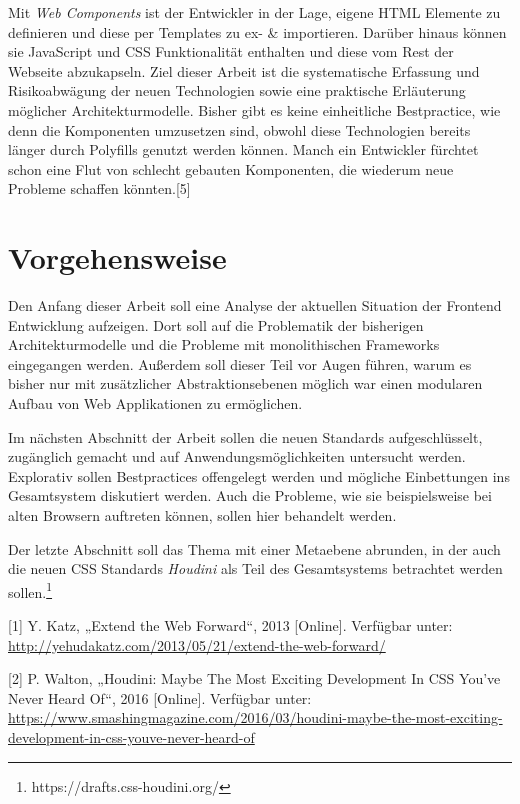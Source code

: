 Mit \emph{Web Components} ist der Entwickler in der Lage, eigene HTML
Elemente zu definieren und diese per Templates zu ex- \& importieren.
Darüber hinaus können sie JavaScript und CSS Funktionalität enthalten
und diese vom Rest der Webseite abzukapseln. Ziel dieser Arbeit ist die
systematische Erfassung und Risikoabwägung der neuen Technologien sowie
eine praktische Erläuterung möglicher Architekturmodelle. Bisher gibt es
keine einheitliche Bestpractice, wie denn die Komponenten umzusetzen
sind, obwohl diese Technologien bereits länger durch Polyfills genutzt
werden können. Manch ein Entwickler fürchtet schon eine Flut von
schlecht gebauten Komponenten, die wiederum neue Probleme schaffen
könnten.{[}5{]}

\section{Vorgehensweise}\label{vorgehensweise}

Den Anfang dieser Arbeit soll eine Analyse der aktuellen Situation der
Frontend Entwicklung aufzeigen. Dort soll auf die Problematik der
bisherigen Architekturmodelle und die Probleme mit monolithischen
Frameworks eingegangen werden. Außerdem soll dieser Teil vor Augen
führen, warum es bisher nur mit zusätzlicher Abstraktionsebenen möglich
war einen modularen Aufbau von Web Applikationen zu ermöglichen.

Im nächsten Abschnitt der Arbeit sollen die neuen Standards
aufgeschlüsselt, zugänglich gemacht und auf Anwendungsmöglichkeiten
untersucht werden. Explorativ sollen Bestpractices offengelegt werden
und mögliche Einbettungen ins Gesamtsystem diskutiert werden. Auch die
Probleme, wie sie beispielsweise bei alten Browsern auftreten können,
sollen hier behandelt werden.

Der letzte Abschnitt soll das Thema mit einer Metaebene abrunden, in der
auch die neuen CSS Standards \emph{Houdini} als Teil des Gesamtsystems
betrachtet werden sollen.\footnote{https://drafts.css-houdini.org/}

\hypertarget{refs}{}
\hypertarget{ref-Katz2013}{}
{[}1{]} Y. Katz, „Extend the Web Forward``, 2013 {[}Online{]}. Verfügbar
unter: \url{http://yehudakatz.com/2013/05/21/extend-the-web-forward/}

\hypertarget{ref-Walton2016}{}
{[}2{]} P. Walton, „Houdini: Maybe The Most Exciting Development In CSS
You've Never Heard Of``, 2016 {[}Online{]}. Verfügbar unter:
\url{https://www.smashingmagazine.com/2016/03/houdini-maybe-the-most-exciting-development-in-css-youve-never-heard-of}

